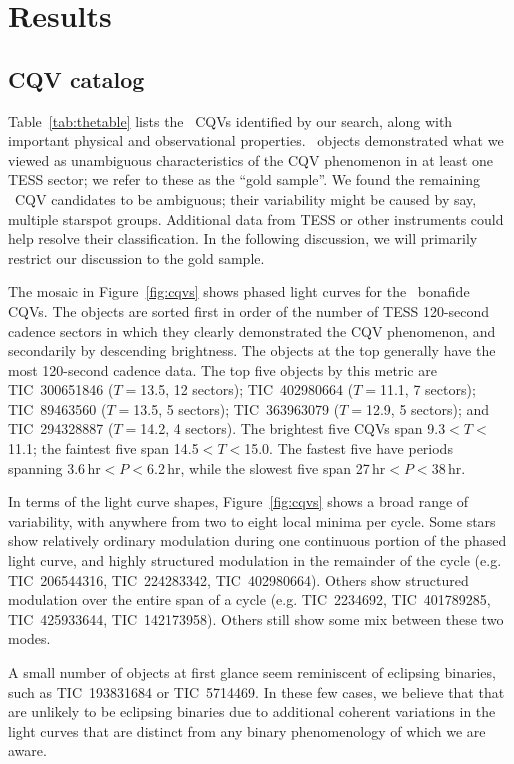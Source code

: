 \documentclass[11pt,twocolumn,tighten]{aastex63}
\begin{document}
\section{Results}
\label{sec:results}

\subsection{CQV catalog}
\label{sec:catalog}

Table~\ref{tab:thetable} lists the \ncpvsfound\ CQVs identified by our
search, along with important physical and observational properties.
\ngoods\ objects demonstrated what we viewed as unambiguous
characteristics of the CQV phenomenon in at least one TESS sector; we
refer to these as the ``gold sample''.  We found the remaining
\nmaybes\ CQV candidates to be ambiguous; their variability might be
caused by say, multiple starspot groups.  Additional data from TESS or
other instruments could help resolve their classification.  In the
following discussion, we will primarily restrict our discussion to the
gold sample.

The mosaic in Figure~\ref{fig:cqvs} shows phased light curves for the
\ngoods\ bonafide CQVs.  The objects are sorted first in order of the
number of TESS 120-second cadence sectors in which they clearly
demonstrated the CQV phenomenon, and secondarily by descending
brightness.  The objects at the top generally have the most 120-second
cadence data.  The top five objects by this metric are TIC~300651846
($T$$=$13.5, 12 sectors); TIC~402980664 ($T$$=$11.1, 7 sectors);
TIC~89463560 ($T$$=$13.5, 5 sectors); TIC~363963079 ($T$$=$12.9, 5
sectors); and TIC~294328887 ($T$$=$14.2, 4 sectors).  The brightest
five CQVs span 9.3$<$$T$$<$11.1; the faintest five span
14.5$<$$T$$<$15.0.  The fastest five have periods spanning
3.6\,hr$<$$P$$<$6.2\,hr, while the slowest five span
27\,hr$<$$P$$<$38\,hr.

In terms of the light curve shapes, Figure~\ref{fig:cqvs} shows a
broad range of variability, with anywhere from two to eight local
minima per cycle.  Some stars show relatively ordinary modulation
during one continuous portion of the phased light curve, and highly
structured modulation in the remainder of the cycle (e.g.
TIC~206544316, TIC~224283342, TIC~402980664).  Others show structured
modulation over the entire span of a cycle (e.g. TIC~2234692,
TIC~401789285, TIC~425933644, TIC~142173958).  Others still show some
mix between these two modes.

A small number of objects at first glance seem reminiscent of
eclipsing binaries, such as TIC~193831684 or TIC~5714469.  In these
few cases, we believe that that are unlikely to be eclipsing binaries
due to additional coherent variations in the light curves that are
distinct from any binary phenomenology of which we are aware.
\end{document}
